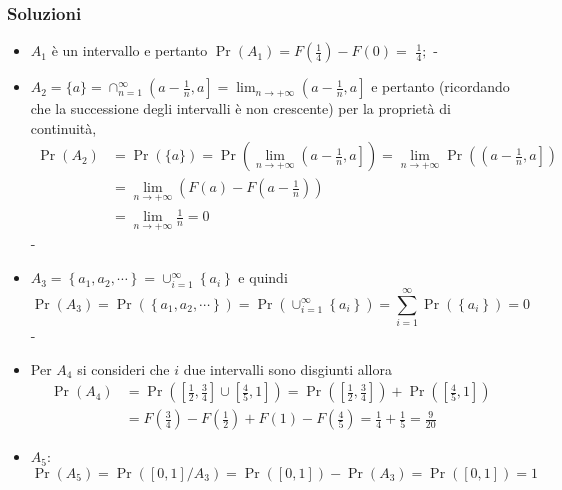 \begin{center}
			\subsubsection*{Soluzioni}
			\begin{itemize}
				\item $A_1$ è un intervallo e pertanto $\Pr\left(A_1\right)=F\left(\frac{1}{4}\right)-F(0)=$ $\frac{1}{4} ;$
				      - \item$A_2=\{a\}=\cap_{n=1}^{\infty}\left(a-\frac{1}{n}, a\right]=\lim _{n \rightarrow+\infty}\left(a-\frac{1}{n}, a\right]$ e pertanto (ricordando che la successione degli intervalli è non crescente) per la proprietà di continuità,
				      \[
					      \begin{aligned}
						      \Pr\left(A_2\right) & =\Pr(\{a\})=\Pr\left(\lim _{n \rightarrow+\infty}\left(a-\frac{1}{n}, a\right]\right)=\lim _{n \rightarrow+\infty} \Pr\left(\left(a-\frac{1}{n}, a\right]\right) \\
						                          & =\lim _{n \rightarrow+\infty}\left(F(a)-F\left(a-\frac{1}{n}\right)\right)                                                                                       \\
						                          & =\lim _{n \rightarrow+\infty} \frac{1}{n}=0
					      \end{aligned}
				      \]
				      -\item $A_3=\left\{a_1, a_2, \cdots\right\}=\cup_{i=1}^{\infty}\left\{a_i\right\}$ e quindi
				      \[
					      \Pr\left(A_3\right)=\Pr\left(\left\{a_1, a_2, \cdots\right\}\right)=\Pr\left(\cup_{i=1}^{\infty}\left\{a_i\right\}\right)=\sum_{i=1}^{\infty} \Pr\left(\left\{a_i\right\}\right)=0
				      \]
				      -\item Per $A_4$ si consideri che $i$ due intervalli sono disgiunti allora
				      \[
					      \begin{aligned}
						      \Pr\left(A_4\right) & =\Pr\left(\left[\frac{1}{2}, \frac{3}{4}\right] \cup\left[\frac{4}{5}, 1\right]\right)=\Pr\left(\left[\frac{1}{2}, \frac{3}{4}\right]\right)+\Pr\left(\left[\frac{4}{5}, 1\right]\right) \\[0.7em]
						                          & =F\left(\frac{3}{4}\right)-F\left(\frac{1}{2}\right)+F(1)-F\left(\frac{4}{5}\right)=\frac{1}{4}+\frac{1}{5}=\frac{9}{20}
					      \end{aligned}
				      \]
				\item $ A_5 $:
				      \[
					      \Pr\left(A_5\right)=\Pr\left([0,1] / A_3\right)=\Pr([0,1])-\Pr\left(A_3\right)=\Pr([0,1])=1
\]
\end{itemize}
\end{center}

